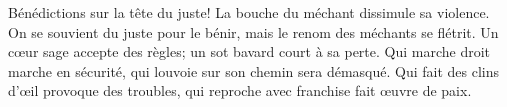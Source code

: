 Bénédictions sur la tête du juste!
	La bouche du méchant dissimule sa violence.
On se souvient du juste pour le bénir,
	mais le renom des méchants se flétrit.
Un cœur sage accepte des règles;
	un sot bavard court à sa perte.
Qui marche droit marche en sécurité,
	qui louvoie sur son chemin sera démasqué.
Qui fait des clins d’œil provoque des troubles,
	qui reproche avec franchise fait œuvre de paix.
